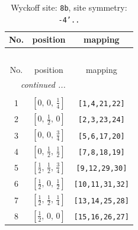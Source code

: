 \documentclass[fleqn,8pt]{jsarticle}
\begin{document}
\begin{longtable}{ccc}
\caption{Wyckoff site: {\tt 8b}, site symmetry: {\tt -4'..}}
 \\
 \hline \hline
No. & position & mapping \\ \hline \endfirsthead

\multicolumn{2}{l}{\tablename\ \thetable{}} \\
 \hline \hline
No. & position & mapping \\ \hline \endhead

 \hline \hline
\multicolumn{2}{r}{\footnotesize\it continued ...} \\ \endfoot

 \hline \hline
\multicolumn{2}{r}{} \\ \endlastfoot

1 & $\left[ 0,\, 0,\, \frac{1}{4} \right]$ & {\tt [1,4,21,22]} \\ \hline
2 & $\left[ 0,\, \frac{1}{2},\, 0 \right]$ & {\tt [2,3,23,24]} \\ \hline
3 & $\left[ 0,\, 0,\, \frac{3}{4} \right]$ & {\tt [5,6,17,20]} \\ \hline
4 & $\left[ 0,\, \frac{1}{2},\, \frac{1}{2} \right]$ & {\tt [7,8,18,19]} \\ \hline
5 & $\left[ \frac{1}{2},\, \frac{1}{2},\, \frac{3}{4} \right]$ & {\tt [9,12,29,30]} \\ \hline
6 & $\left[ \frac{1}{2},\, 0,\, \frac{1}{2} \right]$ & {\tt [10,11,31,32]} \\ \hline
7 & $\left[ \frac{1}{2},\, \frac{1}{2},\, \frac{1}{4} \right]$ & {\tt [13,14,25,28]} \\ \hline
8 & $\left[ \frac{1}{2},\, 0,\, 0 \right]$ & {\tt [15,16,26,27]} \\
\end{longtable}
\renewcommand{\arraystretch}{1.2}
\end{document}
